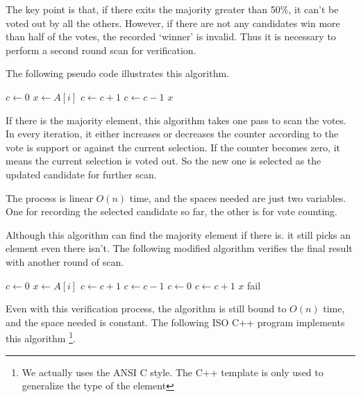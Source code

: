 \documentclass[UTF8]{article}
\begin{document}
The key point is that, if there exits the majority greater than 50\%, it can't be voted out
by all the others. However, if there are not any candidates win more than half of the votes, the recorded
`winner' is invalid. Thus it is necessary to perform a second round scan for verification.

The following pseudo code illustrates this algorithm.

\begin{algorithmic}[1]
  \State $c \gets 0$
      \State $x \gets A[i]$
    \EndIf
      \State $c \gets c + 1$
    \Else
      \State $c \gets c - 1$
    \EndIf
  \EndFor
  \State \Return $x$
\EndFunction
\end{algorithmic}

If there is the majority element, this algorithm takes one pass to scan the votes. In every
iteration, it either increases or decreases the counter according to the vote is support
or against the current selection. If the counter becomes zero, it means the current
selection is voted out. So the new one is selected as the updated candidate for further scan.

The process is linear $O(n)$ time, and the spaces needed are just two variables. One
for recording the selected candidate so far, the other is for vote counting.

Although this algorithm can find the majority element if there is. it still picks an element
even there isn't. The following modified algorithm verifies the final result with
another round of scan.

\begin{algorithmic}[1]
  \State $c \gets 0$
      \State $x \gets A[i]$
    \EndIf
      \State $c \gets c + 1$
    \Else
      \State $c \gets c - 1$
    \EndIf
  \EndFor
  \State $c \gets 0$
      \State $c \gets c + 1$
    \EndIf
  \EndFor
    \State \Return $x$
  \Else
    \State fail
  \EndIf
\EndFunction
\end{algorithmic}

Even with this verification process, the algorithm is still bound to $O(n)$ time, and the
space needed is constant. The following ISO C++ program implements this algorithm \footnote{We actually
uses the ANSI C style. The C++ template is only used to generalize the type of the element}.
\end{document}
